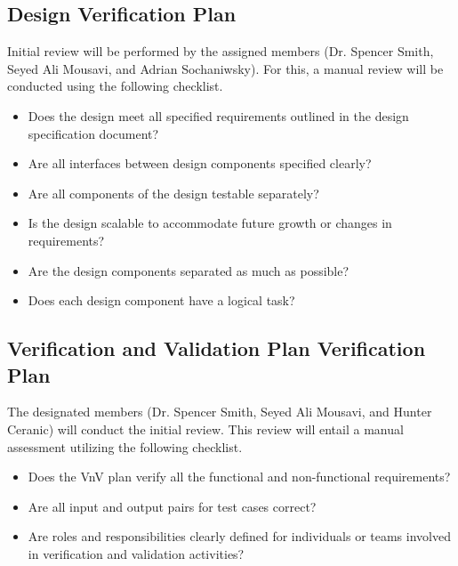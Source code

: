 \documentclass[12pt, titlepage]{article}
\begin{document}


\subsection{Design Verification Plan} \label{sebsec_design_verification_plan}

Initial review will be performed by the assigned members
(Dr. Spencer Smith, Seyed Ali Mousavi, and Adrian Sochaniwsky).
For this, a manual review will be conducted using the following checklist.

\begin{itemize}\renewcommand{\labelitemi}{\scriptsize$\square$}
  \item Does the design meet all specified requirements outlined in the design specification document?
  \item Are all interfaces between design components specified clearly?
  \item Are all components of the design testable separately?
  \item Is the design scalable to accommodate future growth or changes in requirements?
  \item Are the design components separated as much as possible?
  \item Does each design component have a logical task?
\end{itemize}



\subsection{Verification and Validation Plan Verification Plan}
The designated members (Dr. Spencer Smith, Seyed Ali Mousavi, and Hunter Ceranic)
will conduct the initial review. This review will entail
a manual assessment utilizing the following checklist.

\begin{itemize}\renewcommand{\labelitemi}{\scriptsize$\square$}
  \item Does the VnV plan verify all the functional and
        non-functional requirements?
  \item Are all input and output pairs for test cases correct?
  \item Are roles and responsibilities clearly defined for individuals
        or teams involved in verification and validation activities?
\end{itemize}
\end{document}
